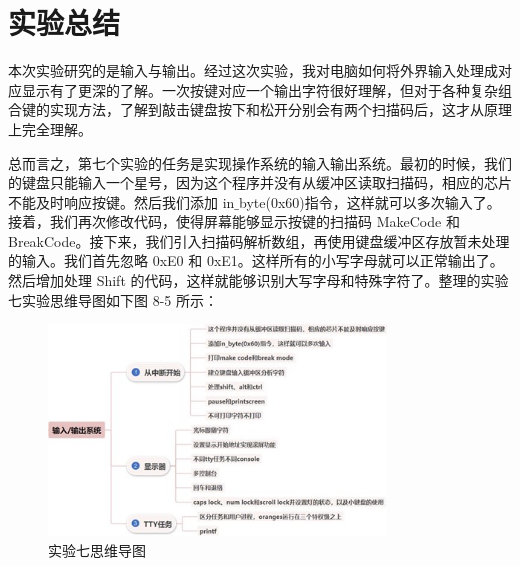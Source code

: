 \section{实验总结}

本次实验研究的是输入与输出。经过这次实验，我对电脑如何将外界输入处理成对应显示有了更深的了解。一次按键对应一个输出字符很好理解，但对于各种复杂组合键的实现方法，了解到敲击键盘按下和松开分别会有两个扫描码后，这才从原理上完全理解。\par
总而言之，第七个实验的任务是实现操作系统的输入输出系统。最初的时候，我们的键盘只能输入一个星号，因为这个程序并没有从缓冲区读取扫描码，相应的芯片不能及时响应按键。然后我们添加 in$\_$byte(0x60)指令，这样就可以多次输入了。接着，我们再次修改代码，使得屏幕能够显示按键的扫描码 MakeCode 和 BreakCode。接下来，我们引入扫描码解析数组，再使用键盘缓冲区存放暂未处理的输入。我们首先忽略 0xE0 和 0xE1。这样所有的小写字母就可以正常输出了。然后增加处理 Shift 的代码，这样就能够识别大写字母和特殊字符了。整理的实验七实验思维导图如下图 8-5 所示：
\begin{figure}[H]
  \centering
  \includegraphics[width=0.8\textwidth]{figures/chapter8/8-5.jpg}
  \caption{实验七思维导图}
  \label{fig:5}
\end{figure}
